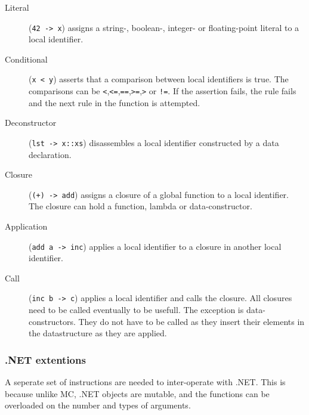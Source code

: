 \begin{description}
\item[Literal] (\verb|42 -> x|) assigns a string-, boolean-, integer- or floating-point literal to a local identifier.
\item[Conditional] (\verb|x < y|) asserts that a comparison between local identifiers is true.
    The comparisons can be \verb|<|,\verb|<=|,\verb|==|,\verb|>=|,\verb|>| or \verb|!=|.
    If the assertion fails, the rule fails and the next rule in the function is attempted.
\item[Deconstructor] (\verb|lst -> x::xs|) disassembles a local identifier constructed by a data declaration.
\item[Closure] (\verb|(+) -> add|) assigns a closure of a global function to a local identifier.
    The closure can hold a function, lambda or data-constructor.
\item[Application] (\verb|add a -> inc|) applies a local identifier to a closure in another local identifier.
\item[Call] (\verb|inc b -> c|) applies a local identifier and calls the closure.
    All closures need to be called eventually to be usefull.
    The exception is data-constructors. 
    They do not have to be called as they insert their elements in the datastructure as they are applied.
\end{description}

\subsubsection{.NET extentions}
A seperate set of instructions are needed to inter-operate with .NET.
This is because unlike MC, .NET objects are mutable, and the functions can be overloaded on the number and types of arguments.

